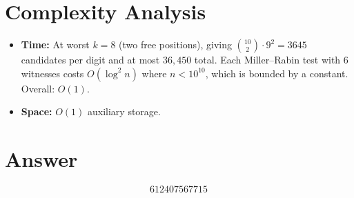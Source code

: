 \documentclass[12pt]{article}
\begin{document}
\section{Complexity Analysis}

\begin{itemize}
\item \textbf{Time:} At worst $k = 8$ (two free positions), giving $\binom{10}{2} \cdot 9^2 = 3645$ candidates per digit and at most $36{,}450$ total. Each Miller--Rabin test with 6 witnesses costs $O(\log^2 n)$ where $n < 10^{10}$, which is bounded by a constant. Overall: $O(1)$.
\item \textbf{Space:} $O(1)$ auxiliary storage.
\end{itemize}

\section{Answer}

\[
\boxed{612407567715}
\]
\end{document}
